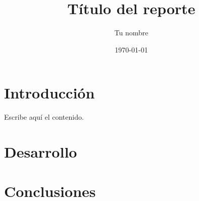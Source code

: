 \documentclass[11pt]{report}
\title{Título del reporte}
\author{Tu nombre}
\date{\today}
\begin{document}
\maketitle
\tableofcontents

\chapter{Introducción}

Escribe aquí el contenido.

\chapter{Desarrollo}

\chapter{Conclusiones}
\end{document}
